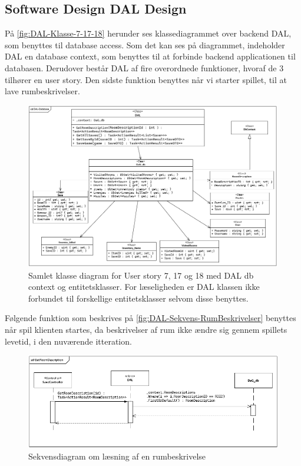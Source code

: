 \subsection{Software Design DAL Design}
På \autoref{fig:DAL-Klasse-7-17-18} herunder ses klassediagrammet over backend DAL, som benyttes til database access. 
Som det kan ses på diagrammet, indeholder DAL en database context, som benyttes til at forbinde backend applicationen til databasen. 
Derudover består DAL af fire overordnede funktioner, hvoraf de 3 tilhører en user story. 
Den sidste funktion benyttes når vi starter spillet, til at lave rumbeskrivelser.\\

\begin{figure}[H]
\centering
\includegraphics[width = \textwidth]{02-Body/Images/DAL-Database/DAL-DB-CD.PNG}
\caption{Samlet klasse diagram for User story 7, 17 og 18 med DAL db context og entitetsklasser.
For læseligheden er DAL klassen ikke forbundet til forskellige entitetsklasser selvom disse benyttes.}
\label{fig:DAL-Klasse-7-17-18}
\end{figure}

Følgende funktion som beskrives på \autoref{fig:DAL-Sekvens-RumBeskrivelser} benyttes når spil klienten startes, da beskrivelser af rum ikke ændre sig gennem spillets levetid, i den nuværende itteration.\\

\begin{figure}[H]
\centering
\includegraphics[width = \textwidth]{02-Body/Images/DAL-Database/RoomDescriptionSd.PNG}
\caption{Sekvensdiagram om læsning af en rumbeskrivelse}
\label{fig:DAL-Sekvens-RumBeskrivelser}
\end{figure}

